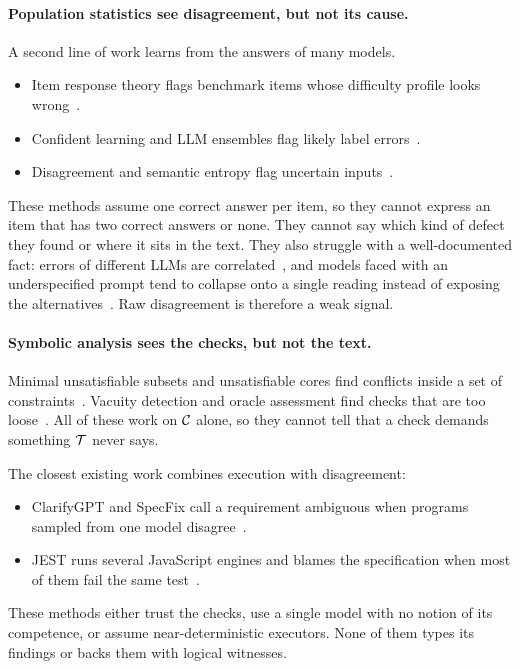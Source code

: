 \paragraph{Population statistics see disagreement, but not its cause.} A second line of work learns from the answers of many models.
\begin{itemize}[leftmargin=*]
\item Item response theory flags benchmark items whose difficulty profile looks wrong~\cite{rodriguez2021evaluation,land2026auditing}.
\item Confident learning and LLM ensembles flag likely label errors~\cite{northcutt2021confident,nahum2025llms,klie2023annotation}.
\item Disagreement and semantic entropy flag uncertain inputs~\cite{kuhn2023semantic,farquhar2024detecting,zhang2025stress}.
\end{itemize}
These methods assume one correct answer per item, so they cannot express an item that has two correct answers or none. They cannot say which kind of defect they found or where it sits in the text. They also struggle with a well-documented fact: errors of different LLMs are correlated~\cite{kim2025correlated,goel2025great}, and models faced with an underspecified prompt tend to collapse onto a single reading instead of exposing the alternatives~\cite{richter2026underspecification}. Raw disagreement is therefore a weak signal.

\paragraph{Symbolic analysis sees the checks, but not the text.} Minimal unsatisfiable subsets and unsatisfiable cores find conflicts inside a set of constraints~\cite{liffiton2008algorithms,torlak2008finding,shlyakhter2003debugging}. Vacuity detection and oracle assessment find checks that are too loose~\cite{kupferman2003vacuity,jahangirova2016test,schuler2011assessing}. All of these work on $\mathcal{C}$ alone, so they cannot tell that a check demands something $\mathcal{T}$ never says.

The closest existing work combines execution with disagreement:
\begin{itemize}[leftmargin=*]
\item ClarifyGPT and SpecFix call a requirement ambiguous when programs sampled from one model disagree~\cite{mu2024clarifygpt,jia2025automated}.
\item JEST runs several JavaScript engines and blames the specification when most of them fail the same test~\cite{park2021jest}.
\end{itemize}
These methods either trust the checks, use a single model with no notion of its competence, or assume near-deterministic executors. None of them types its findings or backs them with logical witnesses.

